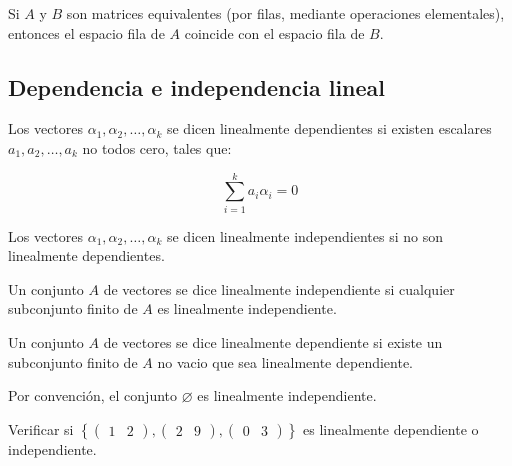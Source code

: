		\begin{definicion}
			Si $A$ y $B$ son matrices equivalentes (por filas, mediante operaciones elementales), entonces el espacio fila de $A$ coincide con el espacio fila de $B$.
		\end{definicion}
 

	\subsection{Dependencia e independencia lineal}

		\begin{definicion}
			Los vectores $\alpha_1, \alpha_2, \dots, \alpha_k$ se dicen linealmente dependientes si existen escalares $a_1, a_2, \dots, a_k$ no todos cero, tales que:

			\begin{equation}
				\sum_{i=1}^k a_i \alpha_i = 0
			\end{equation}

			Los vectores $\alpha_1, \alpha_2, \dots, \alpha_k$ se dicen linealmente independientes si no son linealmente dependientes.
		\end{definicion}

		\begin{definicion}
			Un conjunto $A$ de vectores se dice linealmente independiente si cualquier subconjunto finito de $A$ es linealmente independiente.
		\end{definicion}

		\begin{definicion}
			Un conjunto $A$ de vectores se dice linealmente dependiente si existe un subconjunto finito de $A$ no vacio que sea linealmente dependiente.
		\end{definicion}

		\begin{observacion}
			Por convención, el conjunto $\varnothing$ es linealmente independiente.
		\end{observacion}

		\begin{ejemplo}
			Verificar si $\left\{ \begin{pmatrix} 1 & 2 \end{pmatrix}, \begin{pmatrix} 2 & 9 \end{pmatrix}, \begin{pmatrix} 0 & 3 \end{pmatrix} \right\}$ es linealmente dependiente o independiente.
		\end{ejemplo}

